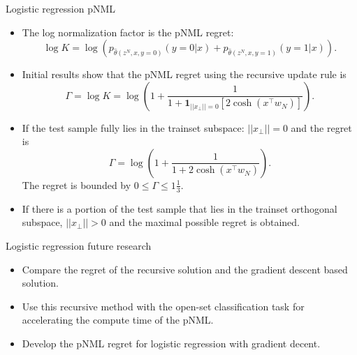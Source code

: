\documentclass[aspectratio=169]{beamer}
\begin{document}
\begin{frame}{Logistic regression pNML}
\begin{itemize}
\item The log normalization factor is the pNML regret:
\begin{equation}
    \log K = \log \left(p_{\hat{\theta}(z^N,x,y=0)}(y=0|x) + p_{\hat{\theta}(z^N,x,y=1)}(y=1|x)\right).
\end{equation}
\item Initial results show that the pNML regret using the recursive update rule is
\begin{equation}
    \Gamma = \log K = \log \left(1 + \frac{1}{1 +  \mathbf{1}_{||x_\bot|| = 0} \left[ 2\cosh{\left(x^\top w_N \right)} \right]}\right).
\end{equation}
\item If the test sample fully lies in the trainset subspace: $||x_\bot||=0$ and the regret is
\begin{equation}
\Gamma = \log \left(1 + \frac{1}{1 + 2\cosh{\left(x^\top w_N \right)}}\right).
\end{equation}
The regret is bounded by $0 \leq \Gamma \leq 1\frac{1}{3}$.
\item If there is a portion of the test sample that lies in the trainset orthogonal subspace, $||x_\bot||>0$ and the maximal possible regret is obtained.
\end{itemize}
\end{frame}

\begin{frame}{Logistic regression future research}
\begin{itemize}
\setlength\itemsep{2em}
\item Compare the regret of the recursive solution and the gradient descent based solution.
\item  Use this recursive method with the open-set classification task for accelerating the compute time of the pNML.
\item Develop the pNML regret for logistic regression with gradient decent.
\end{itemize}
\end{frame}
\end{document}
